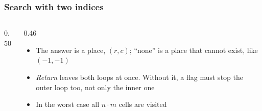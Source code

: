 \documentclass[aspectratio=169,10pt,compress]{beamer}
\begin{document}
\begin{frame}[t,fragile] \frametitle{Search with two indices}
	\begin{columns}[T]
		\begin{column}{0.50\textwidth}


\begin{algorithm}[H]
				\caption{Find($t, x$)}
				\;
\end{algorithm}

		\end{column}
		\begin{column}{0.46\textwidth}
			\begin{itemize}\small
				\item The answer is a place, $(r, c)$; ``none'' is a place that cannot exist, like $(-1, -1)$
				\item \emph{Return} leaves both loops at once. Without it, a flag must stop the outer loop
					  too, not only the inner one
				\item In the worst case all $n \cdot m$ cells are visited
			\end{itemize}
		\end{column}
	\end{columns}
\end{frame}
\end{document}
